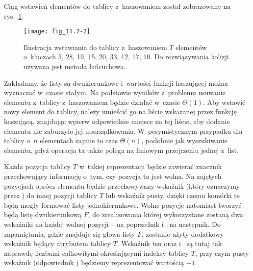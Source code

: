 \exercise %
Ciąg wstawień elementów do tablicy z~haszowaniem został zobrazowany na rys.\ \ref{fig:11.2-2}.
\medskip
\begin{figure}[ht!]
	\begin{center}
		\texttt{[image: fig\_11.2-2]}
	\end{center}
	\caption{Ilustracja wstawiania do tablicy z~haszowaniem $T$ elementów o~kluczach 5, 28, 19, 15, 20, 33, 12, 17, 10.
Do rozwiązywania kolizji używana jest metoda łańcuchowa.} \label{fig:11.2-2}
\end{figure}

\exercise %
Zakładamy, że listy są dwukierunkowe i~wartości funkcji haszującej można wyznaczać w~czasie stałym.
Na podstawie wyników z~problemu  usuwanie elementu z~tablicy z~haszowaniem będzie działać w~czasie $\Theta(1)$.
Aby wstawić nowy element do tablicy, należy umieścić go na liście wskazanej przez funkcję haszującą, znajdując wpierw odpowiednie miejsce na tej liście, aby dodanie elementu nie zaburzyło jej uporządkowania.
W~pesymistycznym przypadku dla tablicy o~$n$ elementach zajmie to czas $\Theta(n)$, podobnie jak wyszukiwanie elementu, gdyż operacja ta także polega na liniowym przejrzeniu jednej z~list.

\exercise %

\noindent Każda pozycja tablicy $T$ w~takiej reprezentacji będzie zawierać znacznik przechowujący informację o~tym, czy pozycja ta jest wolna.
Na zajętych pozycjach oprócz elementu będzie przechowywany wskaźnik (który oznaczymy przez ) do innej pozycji tablicy $T$ lub wskaźnik pusty, dzięki czemu komórki te będą mogły formować listy jednokierunkowe.
Wolne pozycje natomiast tworzyć będą listę dwukierunkową $F$, do zrealizowania której wykorzystane zostaną dwa wskaźniki na każdej wolnej pozycji --  na poprzednik i~ na następnik.
Do zapamiętania, gdzie znajduje się głowa listy $F$, zostanie użyty dodatkowy wskaźnik będący atrybutem tablicy $T$.
Wskaźnik ten oraz  i~ są tutaj tak naprawdę liczbami całkowitymi określającymi indeksy tablicy $T$, przy czym pusty wskaźnik (odpowiednik ) będziemy reprezentować wartością $-1$.

